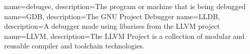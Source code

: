 {
    name=debugee,
    description={The program or machine that is being debugged}
}
{
    name=GDB,
    description={The GNU Project Debugger}
}
{
    name=LLDB,
    description={A debugger made using libarises from the LLVM project}
}
{
    name=LLVM,
    description={The LLVM Project is a collection of modular and reusable compiler and toolchain technologies.}
}



